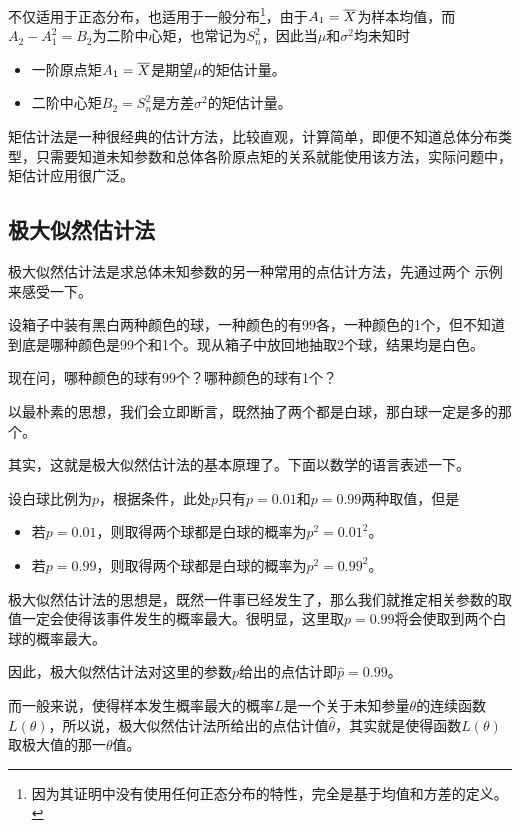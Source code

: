 不仅适用于正态分布，也适用于一般分布\footnote{因为其证明中没有使用任何正态分布的特性，完全是基于均值和方差的定义。}，由于$A_1=\overline{X}$为样本均值，而$A_2-A_1^2=B_2$为二阶中心矩，也常记为$S_n^2$，因此当$\mu$和$\sigma^2$均未知时
\begin{itemize}
    \item 一阶原点矩$A_1=\overline{X}$是期望$\mu$的矩估计量。
    \item 二阶中心矩$B_2=S_n^2$是方差$\sigma^2$的矩估计量。
\end{itemize}
矩估计法是一种很经典的估计方法，比较直观，计算简单，即便不知道总体分布类型，只需要知道未知参数和总体各阶原点矩的关系就能使用该方法，实际问题中，矩估计应用很广泛。

\subsection{极大似然估计法}
极大似然估计法是求总体未知参数的另一种常用的点估计方法，先通过两个 示例来感受一下。
\begin{BoxExample}[极大似然估计法]
    设箱子中装有黑白两种颜色的球，一种颜色的有99各，一种颜色的1个，但不知道到底是哪种颜色是99个和1个。现从箱子中放回地抽取2个球，结果均是白色。

    现在问，哪种颜色的球有99个？哪种颜色的球有1个？
\end{BoxExample}

\begin{Solution}
    以最朴素的思想，我们会立即断言，既然抽了两个都是白球，那白球一定是多的那个。

    其实，这就是极大似然估计法的基本原理了。下面以数学的语言表述一下。

    设白球比例为$p$，根据条件，此处$p$只有$p=0.01$和$p=0.99$两种取值，但是
    \begin{itemize}
        \item 若$p=0.01$，则取得两个球都是白球的概率为$p^2=0.01^2$。
        \item 若$p=0.99$，则取得两个球都是白球的概率为$p^2=0.99^2$。
    \end{itemize}
    极大似然估计法的思想是，既然一件事已经发生了，那么我们就推定相关参数的取值一定会使得该事件发生的概率最大。很明显，这里取$p=0.99$将会使取到两个白球的概率最大。

    因此，极大似然估计法对这里的参数$p$给出的点估计即$\hat{p}=0.99$。
\end{Solution}

而一般来说，使得样本发生概率最大的概率$L$是一个关于未知参量$\theta$的连续函数$L(\theta)$，所以说，极大似然估计法所给出的点估计值$\hat{\theta}$，其实就是使得函数$L(\theta)$取极大值的那一$\theta$值。

